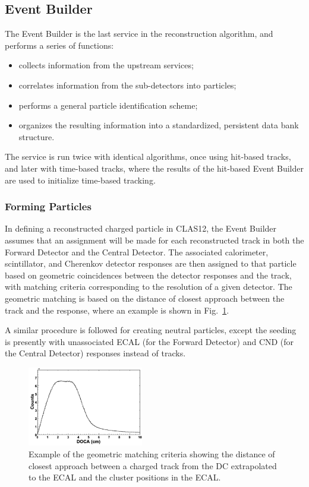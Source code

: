 \subsection{Event Builder}
\label{sec:eb}

The Event Builder is the last service in the reconstruction algorithm, and performs a series of functions:

\begin{itemize}
    \item collects information from the upstream services;
    \item correlates information from the sub-detectors into particles;
    \item performs a general particle identification scheme;
    \item organizes the resulting information into a standardized, persistent data bank structure.
\end{itemize}

The service is run twice with identical algorithms, once using hit-based tracks, and later with time-based tracks,
where the results of the hit-based Event Builder are used to initialize time-based tracking.

\subsubsection{Forming Particles}

In defining a reconstructed charged particle in CLAS12, the Event Builder assumes that an assignment will be
made for each reconstructed track in both the Forward Detector and the Central Detector. The associated
calorimeter, scintillator, and Cherenkov detector responses are then assigned to that particle based on
geometric coincidences between the detector responses and the track, with matching criteria corresponding
to the resolution of a given detector. The geometric matching is based on the distance of closest approach
between the track and the response, where an example is shown in Fig.~\ref{fig:ebmatch}.

A similar procedure is followed for creating neutral particles, except the seeding is presently with
unassociated ECAL (for the Forward Detector) and CND (for the Central Detector) responses instead of tracks.

\begin{figure}
\centering
\includegraphics[width=0.45\textwidth,height=0.2\textheight]{pics/pcal-doca.png}
\caption{Example of the geometric matching criteria showing the distance of closest approach between a charged
  track from the DC extrapolated to the ECAL and the cluster positions in the ECAL.}
  \label{fig:ebmatch}
\end{figure}

